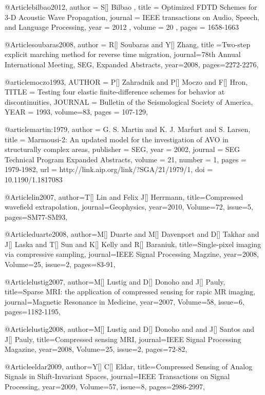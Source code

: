 @Article{bilbao2012,
 author =  { S[] Bilbao },
 title =   {Optimized FDTD Schemes for 3-D Acoustic Wave Propagation},
 journal = { IEEE transactions on Audio, Speech, and Language Processing},
 year =    { 2012 },
 volume =  { 20 },
 pages =   { 1658-1663}
}

@Article{soubaras2008,
  author = {R[] Soubaras and Y[] Zhang},
  title ={Two-step explicit marching method for reverse time migration},
  journal={78th Annual International Meeting, SEG, Expanded Abstracts},
  year=2008,
  pages={2272-2276},
}

@article{moczo1993,
  AUTHOR =       {P[] Zahradnik and P[] Moczo and F[] Hron},
  TITLE =        {Testing four elastic finite-difference schemes for behavior at discontinuities},
  JOURNAL =      {Bulletin of the Seismological Society of America},
  YEAR =         {1993},
  volume=83,
  pages = {107-129},
}

@article{martin:1979,
  author =	 {G. S. Martin and K. J. Marfurt and S. Larsen},
  title =	 {Marmousi-2: An updated model for the investigation
                  of AVO in structurally complex areas},
  publisher =	 {SEG},
  year =	 2002,
  journal =	 {SEG Technical Program Expanded Abstracts},
  volume =	 21,
  number =	 1,
  pages =	 {1979-1982},
  url =		 {http://link.aip.org/link/?SGA/21/1979/1},
  doi =		 {10.1190/1.1817083}
}

@Article{lin2007,
  author={T[] Lin and Felix J[] Herrmann},
  title={Compressed wavefield extrapolation},
  journal={Geophysics},
  year=2010,
  Volume=72,
  issue=5,
  pages={SM77-SM93},
}

@Article{duarte2008,
  author={M[] Duarte and M[] Davenport and D[] Takhar and J[] Laska and T[] Sun and K[] Kelly and R[] Baraniuk},
  title={Single-pixel imaging via compressive sampling},
  journal={IEEE Signal Processing Magzine},
  year=2008,
  Volume=25,
  issue=2,
  pages={83-91},
}

@Article{lustig2007,
  author={M[] Lustig and D[] Donoho and J[] Pauly},
  title={Sparse MRI: the application of compressed sensing for rapic MR imaging},
  journal={Magnetic Resonance in Medicine},
  year=2007,
  Volume=58,
  issue=6,
  pages={1182-1195},
}

@Article{lustig2008,
  author={M[] Lustig and D[] Donoho and and J[] Santos and J[] Pauly},
  title={Compressed sensing MRI},
  journal={IEEE Signal Processing Magazine},
  year=2008,
  Volume=25,
  issue=2,
  pages={72-82},
}

@Article{eldar2009,
  author={Y[] C[] Eldar},
  title={Compressed Sensing of Analog Signals in Shift-Invariant Spaces},
  journal={IEEE Transactions on Signal Processing},
  year=2009,
  Volume=57,
  issue=8,
  pages={2986-2997},
}

